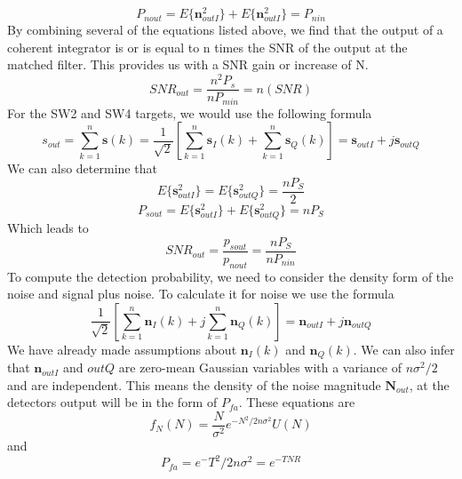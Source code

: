 \documentclass[12pt]{article}
\begin{document}
\begin{equation}
    P_{nout} = E\{ \textbf{n}^2_{outI} \} + E\{ \textbf{n}^2_{outI} \} = P_{nin}
\end{equation}
By combining several of the equations listed above, we find that the output of a coherent integrator is or is equal to n times the SNR of the output at the matched filter. This provides us with a SNR gain or increase of N. 
\begin{equation}
    SNR_{out} = \frac{n^2 P_s}{nP_{min}} = n(SNR)
\end{equation}
For the SW2 and SW4 targets, we would use the following formula
\begin{equation}
    s_{out} = \sum_{k=1}^{n} \textbf{s}(k) = \frac{1}{\sqrt{2}} \left[ \sum_{k=1}^{n} \textbf{s}_I (k) + \sum_{k=1}^{n} \textbf{s}_Q (k) \right] = \textbf{s}_{outI} + j \textbf{s}_{outQ}
\end{equation}
We can also determine that 
\begin{equation}
    E\{\textbf{s}^2_{outI} \} = E \{ \textbf{s}^2_{outQ}\} = \frac{nP_S}{2}
\end{equation}
\begin{equation}
    P_{sout} = E\{\textbf{s}^2_{outI} \} + E\{\textbf{s}^2_{outQ} \} = n P_S
\end{equation}
Which leads to 
\begin{equation}
    SNR_{out} = \frac{p_{sout}}{p_{nout}} = \frac{nP_S}{nP_{nin}} 
\end{equation}
To compute the detection probability, we need to consider the density form of the noise and signal plus noise. To calculate it for noise we use the formula
\begin{equation}
    \frac{1}{\sqrt{2}} \left[ \sum_{k=1}^{n} \textbf{n}_I(k) + j \sum_{k=1}^{n} \textbf{n}_Q(k) \right] = \textbf{n}_{outI} + j \textbf{n}_{outQ}
\end{equation}
We have already made assumptions about $\textbf{n}_I (k)$ and $\textbf{n}_Q (k)$. We can also infer that $\textbf{n}_{outI}$ and ${outQ}$ are zero-mean Gaussian variables with a variance of $n\sigma^2/2$ and are independent. This means the density of the noise magnitude $\textbf{N}_{out}$, at the detectors output will be in the form of $P_{fa}$. These equations are
\begin{equation}
    f_N (N) = \frac{N}{\sigma^2} e^{-N^2/2n\sigma^2} U(N)
\end{equation}
and 
\begin{equation}
    P_{fa} = e^-T^2/2n\sigma^2 = e^{-TNR}
\end{equation}
\end{document}
